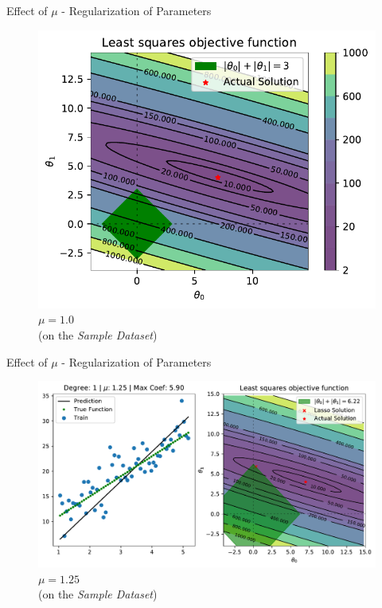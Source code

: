 \documentclass{beamer}
\begin{document}
\begin{frame}{Effect of $\mu$ - Regularization of Parameters}
\vspace{0.4cm}
\begin{figure}

\includegraphics[width=0.9\linewidth]{Lasso/lasso_base_contour.pdf}
\caption{$\mu = 1.0$\\(on the \emph{Sample Dataset})}
\end{figure}
\end{frame}

\begin{frame}{Effect of $\mu$ - Regularization of Parameters}
\vspace{0.4cm}
\begin{figure}\includegraphics[width=0.9\linewidth]{Lasso/lasso_1.25.pdf}\caption{$\mu = 1.25$\\(on the \emph{Sample Dataset})}
\end{figure}
\end{frame}
\end{document}
